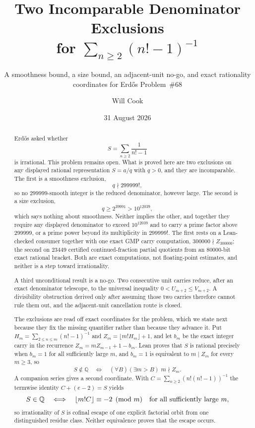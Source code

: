 \documentclass[11pt]{article}
\title{Two Incomparable Denominator Exclusions\\for $\sum_{n\ge2}(n!-1)^{-1}$}
\subtitle{A smoothness bound, a size bound, an adjacent-unit no-go, and exact
rationality coordinates for Erd\H{o}s Problem~\#68}
\author{Will Cook}
\date{31 August 2026}
\newcommand{\Ser}{S}
\begin{document}
\maketitle
\noteprovenance

\begin{abstract}
\noindent
Erd\H{o}s asked whether
\[
  \Ser=\sum_{n\ge2}\frac1{n!-1}
\]
is irrational.  This problem remains open.  What is proved here are two
exclusions on any displayed rational representation $\Ser=a/q$ with $q>0$, and
they are incomparable.  The first is a smoothness exclusion,
\[
  q\nmid299999! ,
\]
so no $299999$-smooth integer is the reduced denominator, however large.  The
second is a size exclusion,
\[
  q\ge2^{39991}>10^{12039},
\]
which says nothing about smoothness.  Neither implies the other, and together
they require any displayed denominator to exceed $10^{12039}$ and to carry a
prime factor above $299999$, or a prime power beyond its multiplicity in
$299999!$.  The first rests on a Lean-checked consumer together with one exact
GMP carry computation, $300000\nmid Z_{300000}$; the second on $23449$
certified continued-fraction partial quotients from an $80000$-bit exact
rational bracket.  Both are exact computations, not floating-point estimates,
and neither is a step toward irrationality.

A third unconditional result is a no-go.  Two consecutive unit carries reduce,
after an exact denominator telescope, to the universal inequality
$0<U_{m+2}\le V_{m+2}$.  A divisibility obstruction derived only after assuming
those two carries therefore cannot rule them out, and the adjacent-unit
cancellation route is closed.

The exclusions are read off exact coordinates for the problem, which we state
next because they fix the missing quantifier rather than because they advance
it.  Put $H_m=\sum_{2\le n\le m}(n!-1)^{-1}$ and $Z_m=\lfloor m!H_m\rfloor+1$,
and let $b_m$ be the exact integer carry in the recurrence
$Z_m=mZ_{m-1}+1-b_m$.  Lean proves that $\Ser$ is rational precisely when
$b_m=1$ for all sufficiently large $m$, and $b_m=1$ is equivalent to $m\mid
Z_m$ for every $m\ge3$, so
\[
  \Ser\notin\mathbb Q
  \quad\Longleftrightarrow\quad
  (\forall B)(\exists m>B)\;m\nmid Z_m .
\]
A companion series gives a second coordinate.  With
$C=\sum_{n\ge2}(n!(n!-1))^{-1}$ the termwise identity $C+(e-2)=\Ser$ yields
\[
  \Ser\in\mathbb Q
  \quad\Longleftrightarrow\quad
  \lfloor m!C\rfloor\equiv-2\pmod m
  \quad\hbox{for all sufficiently large }m,
\]
so irrationality of $\Ser$ is cofinal escape of one explicit factorial orbit
from one distinguished residue class.  Neither equivalence proves that the
escape occurs.


\end{abstract}
\end{document}
